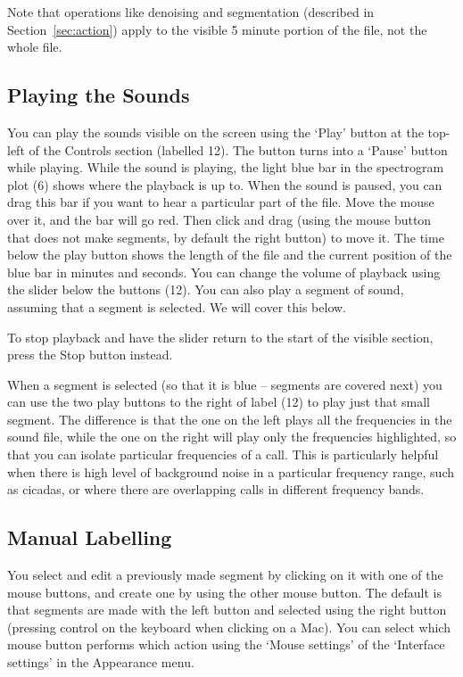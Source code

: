 \documentclass{article}
\begin{document}
Note that operations like denoising and segmentation (described in Section~\ref{sec:action}) apply to the visible 5 minute portion of the file, not the whole file.

\subsection{Playing the Sounds \label{sec:play}}
You can play the sounds visible on the screen using the `Play' button at the top-left of the Controls section (labelled 12). The button turns into a `Pause' button while playing.  While the sound is playing, the light blue bar in the spectrogram plot (6) shows where the playback is up to. When the sound is paused, you can drag this bar if you want to hear a particular part of the file. Move the mouse over it, and the bar will go red. Then click and drag (using the mouse button that does not make segments, by default the right button) to move it. The time below the play button shows the length of the file and the current position of the blue bar in minutes and seconds. You can change the volume of playback using the slider below the buttons (12). You can also play a segment of sound, assuming that a segment is selected. We will cover this below.

To stop playback and have the slider return to the start of the visible section, press the Stop button instead.

When a segment is selected (so that it is blue -- segments are covered next) you can use the two play buttons to the right of label (12) to play just that small segment. The difference is that the one on the left plays all the frequencies in the sound file, while the one on the right will play only the frequencies highlighted, so that you can isolate particular frequencies of a call. This is particularly helpful when there is high level of background noise in a particular frequency range, such as cicadas, or where there are overlapping calls in different frequency bands.

\subsection{Manual Labelling}

You select and edit a previously made segment by clicking on it with one of the mouse buttons,  and create one by using the other mouse button. The default is that segments are made with the left button and selected using the right button (pressing control on the keyboard when clicking on a Mac). You can select which mouse button performs which action using the `Mouse settings' of the `Interface settings' in the Appearance menu.
\end{document}
